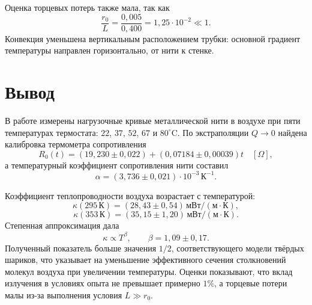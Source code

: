 \documentclass[a4paper,12pt]{article}
\begin{document}
Оценка торцевых потерь также мала, так как
\[
\frac{r_0}{L}=\frac{0{,}005}{0{,}400}=1{,}25\cdot10^{-2}\ll1.
\]
Конвекция уменьшена вертикальным расположением трубки: основной градиент температуры направлен горизонтально, от нити к стенке.

\section{Вывод}

В работе измерены нагрузочные кривые металлической нити в воздухе при пяти температурах термостата: $22$, $37$, $52$, $67$ и $80^\circ\mathrm{C}$. По экстраполяции $Q\to0$ найдена калибровка термометра сопротивления
\[
R_0(t)=(19{,}230\pm0{,}022)+(0{,}07184\pm0{,}00039)t\quad [\Omega],
\]
а температурный коэффициент сопротивления нити составил
\[
\alpha=(3{,}736\pm0{,}021)\cdot10^{-3}\,\text{К}^{-1}.
\]

Коэффициент теплопроводности воздуха возрастает с температурой:
\[
\kappa(295\,\text{К})=(28{,}43\pm0{,}54)\,\text{мВт}/(\text{м}\cdot\text{К}),
\]
\[
\kappa(353\,\text{К})=(35{,}15\pm1{,}20)\,\text{мВт}/(\text{м}\cdot\text{К}).
\]
Степенная аппроксимация дала
\[
\kappa\propto T^{\beta},\qquad \beta=1{,}09\pm0{,}17.
\]
Полученный показатель больше значения $1/2$, соответствующего модели твёрдых шариков, что указывает на уменьшение эффективного сечения столкновений молекул воздуха при увеличении температуры. Оценки показывают, что вклад излучения в условиях опыта не превышает примерно $1\%$, а торцевые потери малы из-за выполнения условия $L\gg r_0$.
\end{document}

